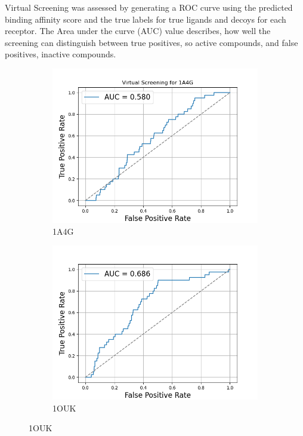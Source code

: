 \documentclass[a4paper,10pt]{article}
\begin{document}
Virtual Screening was assessed by generating a ROC curve using the predicted binding affinity score and the true labels for true ligands and decoys for each receptor. The Area under the curve (AUC) value describes, how well the screening can distinguish between true positives, so active compounds, and false positives, inactive compounds. 


\begin{figure}[h!]
  \centering

  \begin{subfigure}{0.45\linewidth}
    \includegraphics[width=\linewidth]{figures/ROC.png}
    \caption{1A4G}
    \label{fig:a}
  \end{subfigure}
  \hfill
  \begin{subfigure}{0.45\linewidth}
    \includegraphics[width=\linewidth]{figures/ROC-1OUK.png}
    \caption{1OUK}
    \label{fig:b}
  \end{subfigure}


\end{figure}
\end{document}
